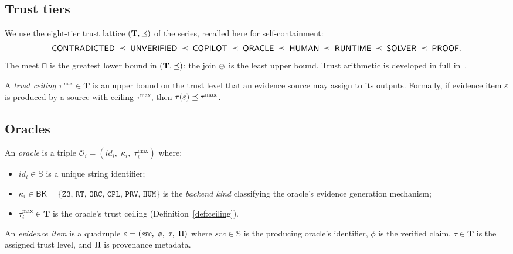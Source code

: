 \documentclass[11pt]{article}
\newcommand{\Oracle}{\mathcal{O}}            %
\newcommand{\Orcl}[1]{\Oracle_{#1}}         %
\newcommand{\tlev}[1]{\tau(#1)}              %
\newcommand{\tmin}{\sqcap}                   %
\newcommand{\BK}{\mathsf{BK}}               %
\newcommand{\EvidItem}{\varepsilon}          %
\newcommand{\TierSet}{\mathbf{T}}           %
\newcommand{\BKset}{\{\texttt{Z3, RT, ORC, CPL, PRV, HUM}\}}
\begin{document}
\subsection{Trust tiers}

We use the eight-tier trust lattice $(\TierSet, \tleq)$ of the \JuGeo{}
series, recalled here for self-containment:
\[
  \mathsf{CONTRADICTED} \;\preceq\; \mathsf{UNVERIFIED} \;\preceq\; \mathsf{COPILOT} \;\preceq\;
  \mathsf{ORACLE} \;\preceq\; \mathsf{HUMAN} \;\preceq\; \mathsf{RUNTIME}
  \;\preceq\; \mathsf{SOLVER} \;\preceq\; \mathsf{PROOF}.
\]
The meet $\tmin$ is the greatest lower bound in $(\TierSet, \tleq)$;
the join $\oplus$ is the least upper bound.  Trust arithmetic is
developed in full in~\cite{jugeo04}.

\begin{definition}\label{def:ceiling}
  A \emph{trust ceiling} $\tau^{\max} \in \TierSet$ is an upper bound on
  the trust level that an evidence source may assign to its outputs.
  Formally, if evidence item $\EvidItem$ is produced by a source with
  ceiling $\tau^{\max}$, then $\tlev{\EvidItem} \tleq \tau^{\max}$.
\end{definition}

\subsection{Oracles}

\begin{definition}[Oracle]\label{def:oracle}
  An \emph{oracle} is a triple
  $\Orcl{i} = (\mathit{id}_i,\; \kappa_i,\; \tau_i^{\max})$
  where:
  \begin{itemize}[nosep]
    \item $\mathit{id}_i \in \mathbb{S}$ is a unique string identifier;
    \item $\kappa_i \in \BK = \BKset$ is the \emph{backend kind}
          classifying the oracle's evidence generation mechanism;
    \item $\tau_i^{\max} \in \TierSet$ is the oracle's trust ceiling
          (Definition~\ref{def:ceiling}).
  \end{itemize}
\end{definition}

\begin{definition}\label{def:evidence-item}
  An \emph{evidence item} is a quadruple
  $\EvidItem = (\mathit{src},\; \phi,\; \tau,\; \prov)$
  where $\mathit{src} \in \mathbb{S}$ is the producing oracle's identifier,
  $\phi$ is the verified claim, $\tau \in \TierSet$ is the assigned
  trust level, and $\Pi$ is provenance metadata.
\end{definition}
\end{document}
